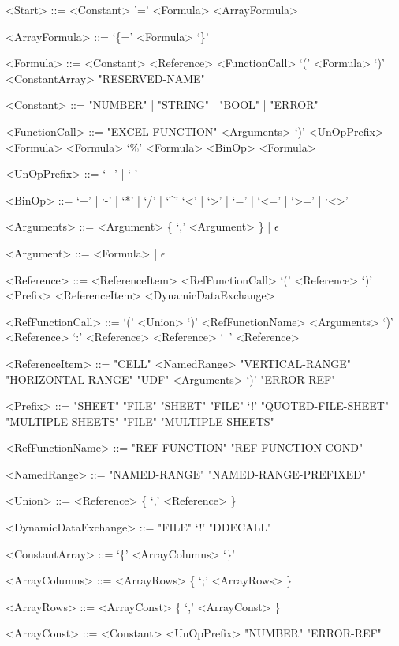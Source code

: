 \begin{grammar}
<Start> ::= <Constant>
	\alt '=' <Formula>
	\alt <ArrayFormula>
	
<ArrayFormula> ::= `\{=' <Formula> `\}'

<Formula> ::= <Constant>
         \alt <Reference>
         \alt <FunctionCall>
         \alt `(' <Formula> `)'
         \alt <ConstantArray>
         \alt "RESERVED-NAME"
         
<Constant> ::= "NUMBER" | "STRING" | "BOOL" | "ERROR"
         
<FunctionCall> ::= "EXCEL-FUNCTION" <Arguments> `)'
		\alt <UnOpPrefix> <Formula>
		\alt <Formula> `\%'
		\alt <Formula> <BinOp> <Formula>
		
<UnOpPrefix> ::= `+' | `-'

<BinOp> ::= `+' | `-' | `*' | `/' | `\textasciicircum'
	\alt `<' | `>' | `=' | `<=' | `>=' | `<>'

	
<Arguments> ::= <Argument> \{ `,' <Argument> \} | $\epsilon$

<Argument> ::= <Formula> | $\epsilon$

<Reference> ::= <ReferenceItem>
    \alt <RefFunctionCall>
	\alt `(' <Reference> `)' 
	\alt <Prefix> <ReferenceItem>
    \alt <DynamicDataExchange>

<RefFunctionCall> ::= `(' <Union> `)'
    \alt <RefFunctionName> <Arguments> `)'
    \alt <Reference> `:' <Reference>
	\alt <Reference> `\ ' <Reference>
    
<ReferenceItem> ::= "CELL"
	\alt <NamedRange>
	\alt "VERTICAL-RANGE"
	\alt "HORIZONTAL-RANGE"
	\alt "UDF" <Arguments> `)'
	\alt "ERROR-REF"
	
<Prefix> ::= "SHEET"
	\alt "FILE" "SHEET"
	\alt "FILE" `!'
	\alt "QUOTED-FILE-SHEET"
	\alt "MULTIPLE-SHEETS"
	\alt "FILE" "MULTIPLE-SHEETS"

<RefFunctionName> ::= "REF-FUNCTION"
			\alt "REF-FUNCTION-COND"
	
<NamedRange> ::= "NAMED-RANGE"
            \alt "NAMED-RANGE-PREFIXED"

<Union> ::= <Reference> \{ `,' <Reference> \}
	
<DynamicDataExchange> ::= "FILE" `!' "DDECALL"

<ConstantArray> ::= `\{' <ArrayColumns> `\}'

<ArrayColumns> ::= <ArrayRows> \{ `;' <ArrayRows> \}

<ArrayRows> ::= <ArrayConst> \{ `,' <ArrayConst> \}
	
<ArrayConst> ::= <Constant>
	\alt <UnOpPrefix> "NUMBER"
	\alt "ERROR-REF"

\end{grammar}